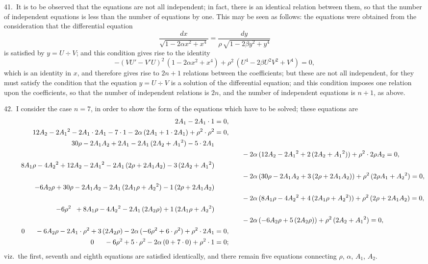 \documentclass[12pt,a4paper]{article}
\theoremstyle{definition}
\begin{document}
41.\ It is to be observed that the equations are not all independent; in fact, there
is an identical relation between them, so that the number of independent equations is
less than the number of equations by one. This may be seen as follows: the equations
were obtained from the consideration that the differential equation
\[
\frac{dx}{\sqrt{1 - 2\alpha x^2 + x^4}}
= \frac{dy}{\rho\, \sqrt{1 - 2\beta y^2 + y^4}}
\]
is satisfied by $y = U \div V$; and this condition gives rise to the identity
\[
-(VU' - V'U)^2\, (1 - 2\alpha x^2 + x^4)
+ \rho^2\, (U^4 - 2\beta U^2 V^2 + V^4) = 0,
\]
which is an identity in $x$, and therefore gives rise to $2n + 1$ relations between the
coefficients; but these are not all independent, for they must satisfy the condition that
the equation $y = U \div V$ is a solution of the differential equation; and this condition
imposes one relation upon the coefficients, so that the number of independent relations
is $2n$, and the number of independent equations is $n + 1$, as above.

42.\ I consider the case $n = 7$, in order to show the form of the equations which
have to be solved; these equations are
\begin{align*}
\makebox[3em][r]{$2A_1$} - 2A_1 \cdot 1 &= 0,\\
\makebox[3em][r]{$12A_2$} - 2A_1{}^2 - 2A_1 \cdot 2A_1 - 7 \cdot 1
- 2\alpha\, (2A_1 + 1 \cdot 2A_1) + \rho^2 \cdot \rho^2 &= 0,\\
\makebox[3em][r]{$30\rho$} - 2A_1 A_2 + 2A_1 - 2A_1\, (2A_2 + A_1{}^2) - 5 \cdot 2A_1 \\
&\qquad\qquad - 2\alpha\, (12A_2 - 2A_1{}^2 + 2\, (2A_2 + A_1{}^2)) + \rho^2 \cdot 2\rho A_2 = 0,\\
\makebox[3em][r]{$8A_1\rho$} - 4A_2{}^2 + 12A_2 - 2A_1{}^2 - 2A_1\, (2\rho + 2A_1 A_2) - 3\, (2A_2 + A_1{}^2) \\
&\qquad\qquad - 2\alpha\, (30\rho - 2A_1 A_2 + 3\, (2\rho + 2A_1 A_2)) + \rho^2\, (2\rho A_1 + A_2{}^2) = 0,\\
-6A_2\rho + 30\rho - 2A_1 A_2 - 2A_1\, (2A_1\rho + A_2{}^2) - 1\, (2\rho + 2A_1 A_2) \\
&\qquad\qquad - 2\alpha\, (8A_1\rho - 4A_2{}^2 + 4\, (2A_1\rho + A_2{}^2)) + \rho^2\, (2\rho + 2A_1 A_2) = 0,\\
-6\rho^2 \;\; + 8A_1\rho - 4A_2{}^2 - 2A_1\, (2A_2\rho) + 1\, (2A_1\rho + A_2{}^2) \\
&\qquad\qquad - 2\alpha\, (-6A_2\rho + 5\, (2A_2\rho)) + \rho^2\, (2A_2 + A_1{}^2) = 0,\\
\makebox[3em][r]{$0$} \quad\;\; - 6A_2\rho - 2A_1 \cdot \rho^2 + 3\, (2A_2\rho)
- 2\alpha\, (-6\rho^2 + 6 \cdot \rho^2) + \rho^2 \cdot 2A_1 &= 0,\\
\makebox[3em][r]{$0$} \quad\;\; - 6\rho^2 + 5 \cdot \rho^2 - 2\alpha\, (0 + 7 \cdot 0) + \rho^2 \cdot 1 &= 0;
\end{align*}
viz.\ the first, seventh and eighth equations are satisfied identically, and there remain
five equations connecting $\rho$, $\alpha$, $A_1$, $A_2$.
\end{document}
